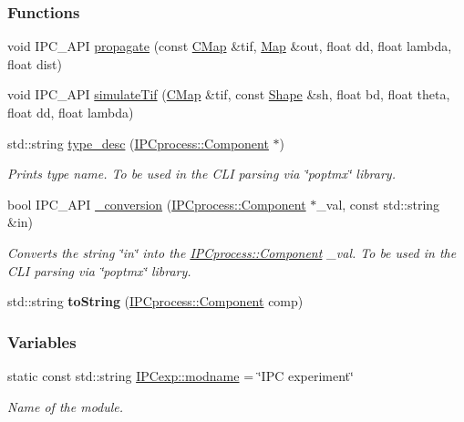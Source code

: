 \subsubsection*{Functions}
\begin{DoxyCompactItemize}
\item 
void IPC\_\-API \hyperlink{group__IPC_ga4868925f354fbd59c75fa1f4e6d22430}{propagate} (const \hyperlink{ipc_8h_aaf0c91c1c42122a86a1b963a42866c64}{CMap} \&tif, \hyperlink{group__Types_ga8747378c016fc11d9ecbb98787248c25}{Map} \&out, float dd, float lambda, float dist)
\item 
void IPC\_\-API \hyperlink{group__IPC_ga257d85bf85edd61aed82ddf5f5e5afc8}{simulateTif} (\hyperlink{ipc_8h_aaf0c91c1c42122a86a1b963a42866c64}{CMap} \&tif, const \hyperlink{group__Types_ga777964671cb4315ce8c56c920db031e3}{Shape} \&sh, float bd, float theta, float dd, float lambda)
\item 
std::string \hyperlink{group__IPC_ga8740636aa1e412e806ab104023700a5b}{type\_\-desc} (\hyperlink{classIPCprocess_a9e159369437f40cc3340171a0f6d3418}{IPCprocess::Component} $\ast$)
\begin{DoxyCompactList}\small\item\em Prints type name. To be used in the CLI parsing via \char`\"{}poptmx\char`\"{} library. \item\end{DoxyCompactList}\item 
bool IPC\_\-API \hyperlink{group__IPC_ga414708530452511476cc1186276308d7}{\_\-conversion} (\hyperlink{classIPCprocess_a9e159369437f40cc3340171a0f6d3418}{IPCprocess::Component} $\ast$\_\-val, const std::string \&in)
\begin{DoxyCompactList}\small\item\em Converts the string \char`\"{}in\char`\"{} into the \hyperlink{classIPCprocess_a9e159369437f40cc3340171a0f6d3418}{IPCprocess::Component} \_\-val. To be used in the CLI parsing via \char`\"{}poptmx\char`\"{} library. \item\end{DoxyCompactList}\item 
\hypertarget{group__IPC_ga20d4ad3e193277fdff7652bef35fa57b}{
std::string {\bfseries toString} (\hyperlink{classIPCprocess_a9e159369437f40cc3340171a0f6d3418}{IPCprocess::Component} comp)}
\label{group__IPC_ga20d4ad3e193277fdff7652bef35fa57b}

\end{DoxyCompactItemize}
\subsubsection*{Variables}
\begin{DoxyCompactItemize}
\item 
static const std::string \hyperlink{group__IPC_ga88026640c1911d43674d75fba7439adf}{IPCexp::modname} = \char`\"{}IPC experiment\char`\"{}
\begin{DoxyCompactList}\small\item\em Name of the module. \item\end{DoxyCompactList}\end{DoxyCompactItemize}


